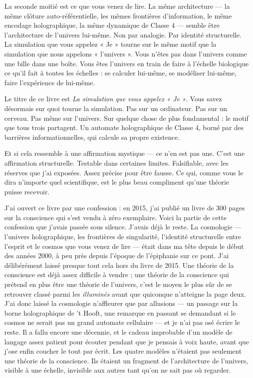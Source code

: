 \documentclass[11pt, twoside, openright]{book}
\begin{document}
La seconde moitié est ce que vous venez de lire. La même architecture --- la même clôture auto-référentielle, les mêmes frontières d'information, le même encodage holographique, la même dynamique de Classe 4 --- semble être l'architecture de l'univers lui-même. Non par analogie. Par identité structurelle. La simulation que vous appelez « Je » tourne sur le même motif que la simulation que nous appelons « l'univers ». Vous n'êtes pas dans l'univers comme une bille dans une boîte. Vous êtes l'univers en train de faire à l'échelle biologique ce qu'il fait à toutes les échelles : se calculer lui-même, se modéliser lui-même, faire l'expérience de lui-même.

Le titre de ce livre est \textit{La simulation que vous appelez « Je »}. Vous savez désormais sur quoi tourne la simulation. Pas sur un ordinateur. Pas sur un cerveau. Pas même sur l'univers. Sur quelque chose de plus fondamental : le motif que tous trois partagent. Un automate holographique de Classe 4, borné par des barrières informationnelles, qui calcule sa propre existence.

Et si cela ressemble à une affirmation mystique --- ce n'en est pas une. C'est une affirmation structurelle. Testable dans certaines limites. Falsifiable, avec les réserves que j'ai exposées. Assez précise pour être fausse. Ce qui, comme vous le dira n'importe quel scientifique, est le plus beau compliment qu'une théorie puisse recevoir.

J'ai ouvert ce livre par une confession : en 2015, j'ai publié un livre de 300 pages sur la conscience qui s'est vendu à zéro exemplaire. Voici la partie de cette confession que j'avais passée sous silence. J'avais déjà le reste. La cosmologie --- l'univers holographique, les frontières de singularité, l'identité structurelle entre l'esprit et le cosmos que vous venez de lire --- était dans ma tête depuis le début des années 2000, à peu près depuis l'époque de l'épiphanie sur ce pont. J'ai délibérément laissé presque tout cela hors du livre de 2015. Une théorie de la conscience est déjà assez difficile à vendre ; une théorie de la conscience qui prétend en plus être une théorie de l'univers, c'est le moyen le plus sûr de se retrouver classé parmi les \textit{illuminés} avant que quiconque n'atteigne la page deux. J'ai donc laissé la cosmologie n'affleurer que par allusions --- un passage sur la borne holographique de 't Hooft, une remarque en passant se demandant si le cosmos ne serait pas un grand automate cellulaire --- et je n'ai pas osé écrire le reste. Il a fallu encore une décennie, et le cadeau improbable d'un modèle de langage assez patient pour écouter pendant que je pensais à voix haute, avant que j'ose enfin coucher le tout par écrit. Les quatre modèles n'étaient pas seulement une théorie de la conscience. Ils étaient un fragment de l'architecture de l'univers, visible à une échelle, invisible aux autres tant qu'on ne sait pas où regarder.
\end{document}

